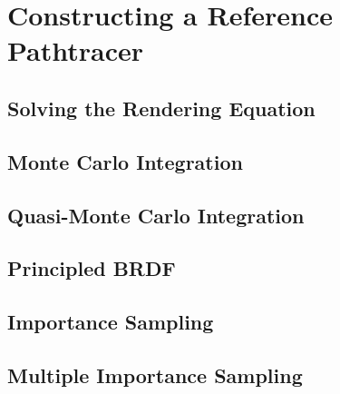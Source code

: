 
\chapter{Constructing a Reference Pathtracer}
\label{chap:pathtracing}

\section{Solving the Rendering Equation}

\section{Monte Carlo Integration}

\section{Quasi-Monte Carlo Integration}

\section{Principled BRDF}

\section{Importance Sampling}

\section{Multiple Importance Sampling}